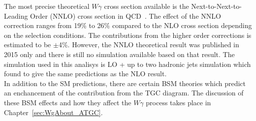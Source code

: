 The most precise theoretical $W\gamma$ cross section available is the Next-to-Next-to-Leading Order (NNLO) cross section in QCD~\cite{ref_theory_NNLO}. The effect of the NNLO correction ranges from 19\% to 26\% compared to the NLO cross section depending on the selection conditions. The contributions from the higher order corrections is estimated to be $\pm$4\%. However, the NNLO theoretical result was published in 2015 only and there is still no simulation available based on that result. The simulation used in this analisys is LO + up to two hadronic jets simulation which found to give the same predictions as the NLO result.\\

In addition to the SM predictions, there are certain BSM theories which predict an enchancement of the contribution from the TGC diagram. The discussion of these BSM effects and how they affect the $W\gamma$ process takes place in Chapter~\ref{sec:WgAbout_ATGC}.\\ 


